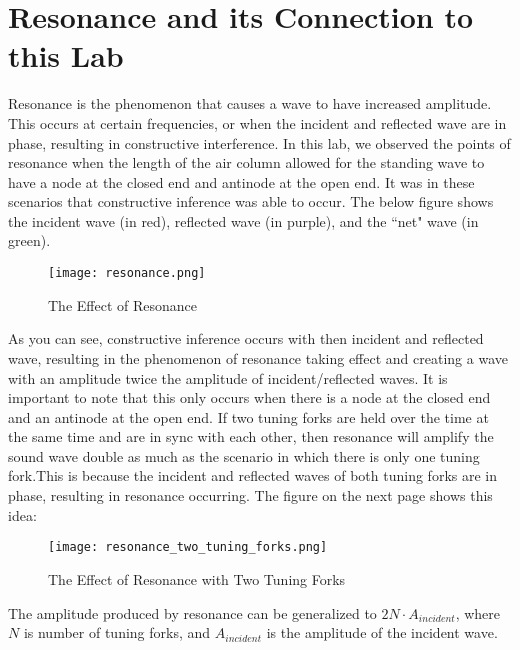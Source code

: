 \documentclass[11pt,twoside]{article}
\begin{document}
\section{Resonance and its Connection to this Lab}

Resonance is the phenomenon that causes a wave to have increased amplitude. This occurs at certain frequencies, or when the incident and reflected wave are in phase, resulting in constructive interference. In this lab, we observed the points of resonance when the length of the air column allowed for the standing wave to have a node at the closed end and antinode at the open end. It was in these scenarios that constructive inference was able to occur. The below figure shows the incident wave (in red), reflected wave (in purple), and the ``net" wave (in green).


\begin{wrapfigure}{l}{0.4\textwidth}
    \centering
    \texttt{[image: resonance.png]}
    \caption{The Effect of Resonance}
\end{wrapfigure}

As you can see, constructive inference occurs with then incident and reflected wave, resulting in the phenomenon of resonance taking effect and creating a wave with an amplitude twice the amplitude of incident/reflected waves. It is important to note that this only occurs when there is a node at the closed end and an antinode at the open end. If two tuning forks are held over the time at the same time and are in sync with each other, then resonance will amplify the sound wave double as much as the scenario in which there is only one tuning fork.This is because the incident and reflected waves of both tuning forks are in phase, resulting in resonance occurring. The figure on the next page shows this idea:

\clearpage 

\begin{figure}
    \centering
    \texttt{[image: resonance\_two\_tuning\_forks.png]}
    \caption{The Effect of Resonance with Two Tuning Forks}
\end{figure} 

The amplitude produced by resonance can be generalized to $2N \cdot A_{incident}$, where $N$ is number of tuning forks, and $A_{incident}$ is the amplitude of the incident wave. 
\end{document}
